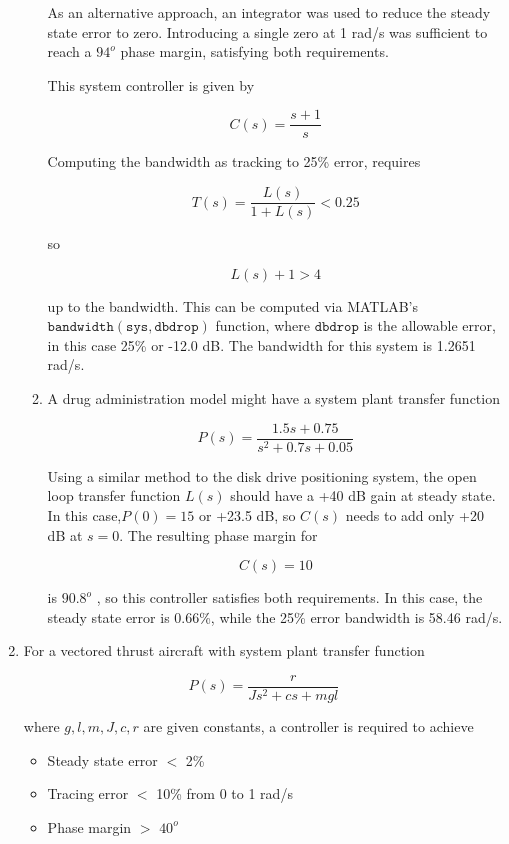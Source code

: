 \documentclass[11pt]{article}
\theoremstyle{definition}
\begin{document}
\begin{enumerate}
\begin{enumerate}
        As an alternative approach, an integrator was used to reduce the steady state error to zero.  Introducing a single zero at 1 rad/s was sufficient to reach a $94^o$ phase margin, satisfying both requirements.

        This system controller is given by

        $$ C(s) = \frac{s + 1}{s} $$

        Computing the bandwidth as tracking to 25\% error, requires 

        $$ T(s) = \frac{L(s)}{1 + L(s)} < 0.25 $$ 

        so

        $$ L(s) + 1 > 4 $$

        up to the bandwidth.  This can be computed via MATLAB's $\mathtt{bandwidth(sys, dbdrop)}$ function, where $\mathtt{dbdrop}$ is the allowable error, in this case 25\% or -12.0 dB.  The bandwidth for this system is 1.2651 rad/s.

        \item %
        A drug administration model might have a system plant transfer function 

        $$ P(s) = \frac{1.5s + 0.75}{s^2 + 0.7s + 0.05} $$

        Using a similar method to the disk drive positioning system, the open loop transfer function $L(s)$ should have a +40 dB gain at steady state.  In this case,$P(0) = 15$ or +23.5 dB, so $C(s)$ needs to add only +20 dB at $s = 0$.  The resulting phase margin for

        $$ C(s) = 10 $$

        is $90.8^o$ , so this controller satisfies both requirements.  In this case, the steady state error is 0.66\%, while the 25\% error bandwidth is 58.46 rad/s.

    \end{enumerate}

    \item %
    For a vectored thrust aircraft with system plant transfer function

    $$ P(s) = \frac{r}{Js^2 + cs + mgl}$$

    where $g, l, m, J, c, r$ are given constants, a controller is required to achieve

    \begin{itemize}
        \item Steady state error $<$ 2\%
        \item Tracing error $<$ 10\% from 0 to 1 rad/s
        \item Phase margin $>$ $40^o$
    \end{itemize}


\end{enumerate}
\end{document}
